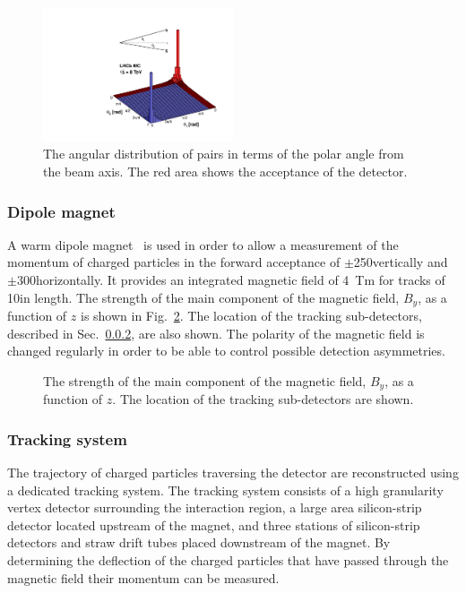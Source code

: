 \begin{figure}[!tb]
\centering
\includegraphics[width=0.5\textwidth]{figs/detector/b_bbar_correlation.pdf}
\caption{The angular distribution of \bquark\bquarkbar pairs in terms of the polar angle from the beam axis. The red area shows the acceptance of the \lhcb detector.}
\label{fig:b_bbar_correlation}
\end{figure}


\subsubsection{Dipole magnet}

A warm dipole magnet~\cite{LHCb-TDR-001} is used in order to allow a measurement of the momentum of charged particles in the forward acceptance of $\pm$250\mrad vertically and $\pm$300\mrad horizontally. It provides an integrated magnetic field of 4~Tm for tracks of 10\m in length. The strength of the main component of the magnetic field, $B_{y}$, as a function of $z$ is shown in Fig.~\ref{fig:magnet}. The location of the tracking sub-detectors, described in Sec.~\ref{sec:lhcb:tracking}, are also shown. The polarity of the magnetic field is changed regularly in order to be able to control possible detection asymmetries.

\begin{figure}[!tb]
\centering
{}
\caption{The strength of the main component of the magnetic field, $B_{y}$, as a function of $z$. The location of the tracking sub-detectors are shown.}
\label{fig:magnet}
\end{figure}

\subsubsection{Tracking system}
\label{sec:lhcb:tracking}

The trajectory of charged particles traversing the \lhcb detector are reconstructed using a dedicated tracking system. The tracking system consists of a high granularity vertex detector surrounding the \proton\proton interaction region, a large area silicon-strip detector located upstream of the magnet, and three stations of silicon-strip detectors and straw drift tubes placed downstream of the magnet. By determining the deflection of the charged particles that have passed through the magnetic field their momentum can be measured.

